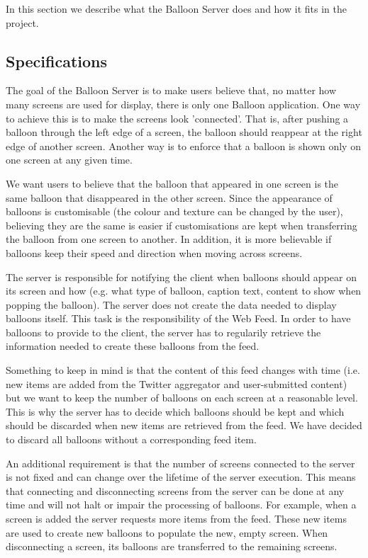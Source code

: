 In this section we describe what the Balloon Server does and how it fits in the
project. 

\subsection{Specifications}

The goal of the Balloon Server is to make users believe that, no matter how
many screens are used for display, there is only one Balloon application. One
way to achieve this is to make the screens look 'connected'. That is, after
pushing a balloon through the left edge of a screen, the balloon should
reappear at the right edge of another screen. Another way is to enforce that a
balloon is shown only on one screen at any given time.

We want users to believe that the balloon that appeared in one screen is the
same balloon that disappeared in the other screen. Since the appearance of
balloons is customisable (the colour and texture can be changed by the user),
believing they are the same is easier if customisations are kept when
transferring the balloon from one screen to another. In addition, it is more
believable if balloons keep their speed and direction when moving across 
screens.

The server is responsible for notifying the client when balloons should appear
on its screen and how (e.g. what type of balloon, caption text, content
to show when popping the balloon). The server does not create the data needed to
display balloons itself. This task is the responsibility of the Web Feed. In
order to have balloons to provide to the client, the server has to regularily
retrieve the information needed to create these balloons from the feed.

Something to keep in mind is that the content of this feed changes with time
(i.e. new items are added from the Twitter aggregator and user-submitted 
content) but we want to keep the number of balloons on each screen at a
reasonable level. This is why the server has to decide which balloons should be
kept and which should be discarded when new items are retrieved from the feed.
We have decided to discard all balloons without a corresponding feed item.

An additional requirement is that the number of screens connected to the server
is not fixed and can change over the lifetime of the server execution. This
means that connecting and disconnecting screens from the server can be done at
any time and will not halt or impair the processing of balloons. For example, 
when a screen is added the server requests more items from the feed. These new
items are used to create new balloons to populate the new, empty screen. When 
disconnecting a screen, its balloons are transferred to the remaining screens.

